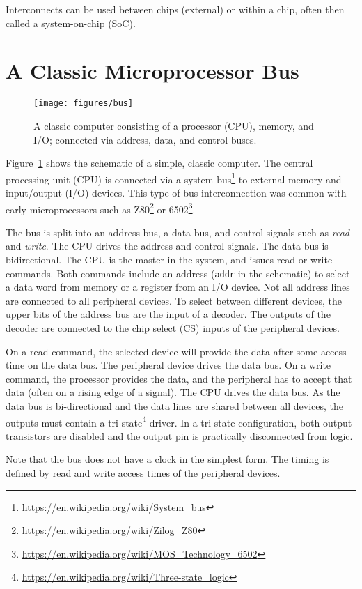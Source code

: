 \documentclass[%
    10pt,
    headinclude, footexclude,
    openright, %
    notitlepage,
    cleardoubleempty,
    headsepline,
    pointlessnumbers,
    bibtotoc, idxtotoc,
    ]{scrbook}
\newcommand{\scale}{0.7}
\newcommand{\code}[1]{{\lstinline[basicstyle=\small\ttfamily]{#1}}}
\newcommand{\myref}[2]{\href{#1}{#2}}
\renewcommand{\myref}[2]{{#2}{\footnote{\url{#1}}}}
\begin{document}
Interconnects can be used between chips (external) or within a chip, often
then called a system-on-chip (SoC).

\section{A Classic Microprocessor Bus}
\label{sect:bus}

\begin{figure}
  \centering
  \texttt{[image: figures/bus]}
  \caption{A classic computer consisting of a processor (CPU), memory, and I/O;
  connected via address, data, and control buses.}
  \label{fig:bus}
\end{figure}

Figure~\ref{fig:bus} shows the schematic of a simple, classic computer.
The central processing unit (CPU) is connected via a
\myref{https://en.wikipedia.org/wiki/System_bus}{system bus} to
external memory and input/output (I/O) devices.
This type of bus interconnection was common with early microprocessors
such as \myref{https://en.wikipedia.org/wiki/Zilog_Z80}{Z80} or
\myref{https://en.wikipedia.org/wiki/MOS_Technology_6502}{6502}.

The bus is split into an address bus, a data bus, and control signals
such as \emph{read} and \emph{write}.
The CPU drives the address and control signals. The data bus is bidirectional.
The CPU is the master in the system, and issues read or write commands.
Both commands include an address (\code{addr} in the schematic) to select
a data word from memory or a register from an I/O device.
Not all address lines are connected to all peripheral devices.
To select between different devices, the upper bits of the address bus are the
input of a decoder. The outputs of the decoder are connected to the chip select (CS)
inputs of the peripheral devices.

On a read command, the selected device will provide the data after some access time
on the data bus. The peripheral device drives the data bus.
On a write command, the processor provides the data, and the peripheral has to
accept that data (often on a rising edge of a signal). The CPU drives the data bus.
As the data bus is bi-directional and the data lines are shared between all devices,
the outputs must contain a \myref{https://en.wikipedia.org/wiki/Three-state_logic}{tri-state}
driver. In a tri-state configuration, both output transistors are disabled and the output pin
is practically disconnected from logic.

Note that the bus does not have a clock in the simplest form. The timing is defined by
read and write access times of the peripheral devices.
\end{document}

